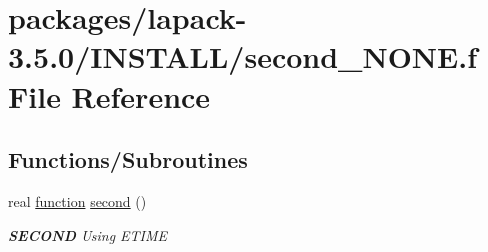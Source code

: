 \hypertarget{lapack-3_85_80_2INSTALL_2second__NONE_8f}{}\section{packages/lapack-\/3.5.0/\+I\+N\+S\+T\+A\+L\+L/second\+\_\+\+N\+O\+N\+E.f File Reference}
\label{lapack-3_85_80_2INSTALL_2second__NONE_8f}
\subsection*{Functions/\+Subroutines}
\begin{DoxyCompactItemize}
\item 
real \hyperlink{afunc_8m_a7b5e596df91eadea6c537c0825e894a7}{function} \hyperlink{group__auxOTHERauxiliary_gae9f971a8b343bd2fcb85c3b16da97f10}{second} ()
\begin{DoxyCompactList}\small\item\em {\bfseries S\+E\+C\+O\+N\+D} Using E\+T\+I\+M\+E \end{DoxyCompactList}\end{DoxyCompactItemize}

